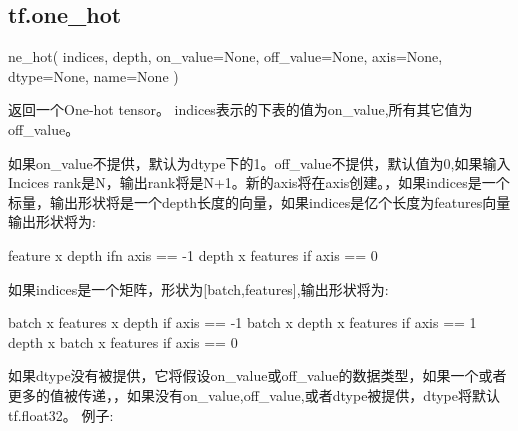\subsection{tf.one\_hot}
\begin{python}
ne_hot(
    indices,
    depth,
    on_value=None,
    off_value=None,
    axis=None,
    dtype=None,
    name=None
)
\end{python}
返回一个One-hot tensor。
indices表示的下表的值为on\_value,所有其它值为off\_value。

如果on\_value不提供，默认为dtype下的1。off\_value不提供，默认值为0,如果输入Incices rank是N，输出rank将是N+1。新的axis将在axis创建。，如果indices是一个标量，输出形状将是一个depth长度的向量，如果indices是亿个长度为features向量输出形状将为:
\begin{python}
feature x depth ifn axis == -1
depth x features if axis == 0
\end{python}
如果indices是一个矩阵，形状为[batch,features],输出形状将为:
\begin{python}
 batch x features x depth if axis == -1
  batch x depth x features if axis == 1
  depth x batch x features if axis == 0
\end{python}
如果dtype没有被提供，它将假设on\_value或off\_value的数据类型，如果一个或者更多的值被传递，，如果没有on\_value,off\_value,或者dtype被提供，dtype将默认tf.float32。
例子:

